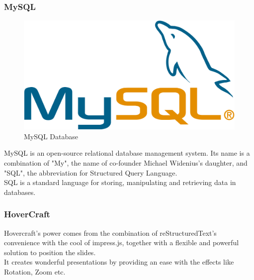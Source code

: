 \subsubsection{MySQL} 
\begin{figure}[h!]
\centering \includegraphics[scale=0.2]{input/images/sql.png}
\caption{MySQL Database}
\end{figure}
MySQL is an open-source relational database management system. Its name is a combination of "My", the name of co-founder Michael Widenius's daughter, and "SQL", the abbreviation for Structured Query Language.\\
SQL is a standard language for storing, manipulating and retrieving data in databases.

\subsubsection{HoverCraft}
Hovercraft's power comes from the combination of reStructuredText's convenience with the cool of impress.js, together with a flexible and powerful solution to position the slides.\\
It creates wonderful presentations by providing an ease with the effects like Rotation, Zoom etc.




